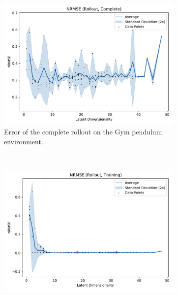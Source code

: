 			\begin{figure}
				\centering
				\begin{subfigure}{0.7\linewidth}
					\centering
					\includegraphics[width=\linewidth]{figures/results/pendulum-gym/latent-dim/comparison-rmse-rollout-normalized-mean-vs-latent-dim.pdf}
					\caption[Error of the complete rollout on the Gym pendulum environment]{Error of the complete rollout on the Gym pendulum environment.}
					\label{fig:gymPendulumRmseComplete}
				\end{subfigure} \\
				\begin{subfigure}{0.5\linewidth}
					\centering
					\includegraphics[width=\linewidth]{figures/results/pendulum-gym/latent-dim/comparison-rmse-rollout-train-normalized-mean-vs-latent-dim.pdf}

\end{subfigure}
\end{figure}

